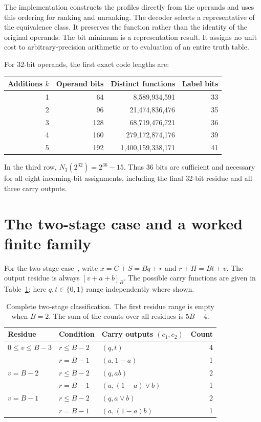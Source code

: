 \documentclass[11pt,a4paper]{article}
\theoremstyle{definition}\newtheorem{definition}[theorem]{Definition}
\begin{document}
The implementation constructs the profiles directly from the operands and
uses this ordering for ranking and unranking. The decoder selects a
representative of the equivalence class. It preserves the function rather
than the identity of the original operands.
The bit minimum is a representation result. It assigns no unit cost to
arbitrary-precision arithmetic or to evaluation of an entire truth table.

For 32-bit operands, the first exact code lengths are:
\begin{center}
\begin{tabular}{rrrr}
\toprule
Additions $k$ & Operand bits & Distinct functions & Label bits\\
\midrule
1 & 64 & 8,589,934,591 & 33\\
2 & 96 & 21,474,836,476 & 35\\
3 & 128 & 68,719,476,721 & 36\\
4 & 160 & 279,172,874,176 & 39\\
5 & 192 & 1,400,159,338,171 & 41\\
\bottomrule
\end{tabular}
\end{center}
In the third row, $N_3(2^{32})=2^{36}-15$. Thus 36 bits are sufficient
and necessary for all eight incoming-bit assignments, including the final
32-bit residue and all three carry outputs.

\section{The two-stage case and a worked finite family}
For the two-stage case~\cite{two-stage}, write $x=C+S=Bq+r$ and $r+H=Bt+v$.
The output residue is always $[v+a+b]_B$.
The possible carry functions are given in Table~\ref{tab:two}; here
$q,t\in\{0,1\}$ range independently where shown.
\begin{table}[ht]
\centering
\begin{tabular}{lll r}
\toprule
Residue & Condition & Carry outputs $(c_1,c_2)$ & Count\\
\midrule
$0\leq v\leq B-3$ & $r\leq B-2$ & $(q,t)$ & 4\\
 & $r=B-1$ & $(a,1-a)$ & 1\\
$v=B-2$ & $r\leq B-2$ & $(q,ab)$ & 2\\
 & $r=B-1$ & $(a,(1-a)\lor b)$ & 1\\
$v=B-1$ & $r\leq B-2$ & $(q,a\lor b)$ & 2\\
 & $r=B-1$ & $(a,(1-a)b)$ & 1\\
\bottomrule
\end{tabular}
\caption{Complete two-stage classification. The first residue range is empty
when $B=2$. The sum of the counts over all residues is $5B-4$.}
\label{tab:two}
\end{table}
\end{document}
